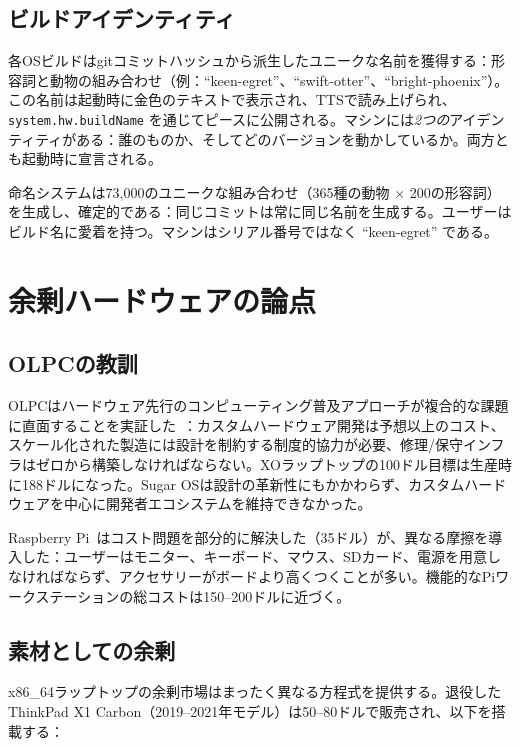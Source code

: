 \documentclass[10pt,letterpaper,twocolumn]{article}
\begin{document}
\subsection{ビルドアイデンティティ}

各OSビルドはgitコミットハッシュから派生したユニークな名前を獲得する：形容詞と動物の組み合わせ（例：``keen-egret''、``swift-otter''、``bright-phoenix''）。この名前は起動時に金色のテキストで表示され、TTSで読み上げられ、\texttt{system.hw.buildName} を通じてピースに公開される。マシンには\emph{2つの}アイデンティティがある：誰のものか、そしてどのバージョンを動かしているか。両方とも起動時に宣言される。

命名システムは73,000のユニークな組み合わせ（365種の動物 $\times$ 200の形容詞）を生成し、確定的である：同じコミットは常に同じ名前を生成する。ユーザーはビルド名に愛着を持つ。マシンはシリアル番号ではなく ``keen-egret'' である。


\section{余剰ハードウェアの論点}
\label{sec:surplus}

\subsection{OLPCの教訓}

OLPCはハードウェア先行のコンピューティング普及アプローチが複合的な課題に直面することを実証した~\citep{kraemer2009olpc}：カスタムハードウェア開発は予想以上のコスト、スケール化された製造には設計を制約する制度的協力が必要、修理/保守インフラはゼロから構築しなければならない。XOラップトップの100ドル目標は生産時に188ドルになった。Sugar OSは設計の革新性にもかかわらず、カスタムハードウェアを中心に開発者エコシステムを維持できなかった。

Raspberry Pi~\citep{raspberry2012}はコスト問題を部分的に解決した（35ドル）が、異なる摩擦を導入した：ユーザーはモニター、キーボード、マウス、SDカード、電源を用意しなければならず、アクセサリーがボードより高くつくことが多い。機能的なPiワークステーションの総コストは150--200ドルに近づく。

\subsection{素材としての余剰}

x86\_64ラップトップの余剰市場はまったく異なる方程式を提供する。退役したThinkPad X1 Carbon（2019--2021年モデル）は50--80ドルで販売され、以下を搭載する：
\end{document}

